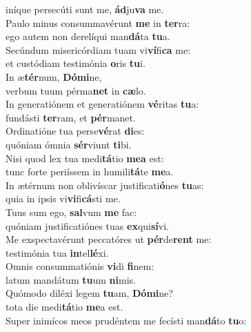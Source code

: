 \evenverse iníque persecúti sunt me, \textbf{ád}ju\textbf{va} me.\\
\oddverse Paulo minus consummavérunt \textbf{me} in \textbf{ter}ra:~\*\\
\oddverse ego autem non derelíqui man\textbf{dá}ta \textbf{tu}a.\\
\evenverse Secúndum misericórdiam tuam vi\textbf{ví}fi\textbf{ca} me:~\*\\
\evenverse et custódiam testimónia \textbf{o}ris \textbf{tu}i.\\
\oddverse In æ\textbf{tér}num, \textbf{Dó}\textbf{mi}ne,~\*\\
\oddverse verbum tuum pérma\textbf{net} in \textbf{cæ}lo.\\
\evenverse In generatiónem et generatiónem \textbf{vé}ritas \textbf{tu}a:~\*\\
\evenverse fundásti \textbf{ter}ram, et \textbf{pér}manet.\\
\oddverse Ordinatióne tua perse\textbf{vé}rat \textbf{di}es:~\*\\
\oddverse quóniam ómnia \textbf{sér}viunt \textbf{ti}bi.\\
\evenverse Nisi quod lex tua medi\textbf{tá}tio \textbf{me}\textbf{a} est:~\*\\
\evenverse tunc forte periíssem in humili\textbf{tá}te \textbf{me}a.\\
\oddverse In ætérnum non oblivíscar justificati\textbf{ó}nes \textbf{tu}as:~\*\\
\oddverse quia in ipsis vi\textbf{vi}fi\textbf{cá}sti me.\\
\evenverse Tuus sum ego, \textbf{sal}vum \textbf{me} fac:~\*\\
\evenverse quóniam justificatiónes tuas \textbf{ex}qui\textbf{sí}vi.\\
\oddverse Me exspectavérunt peccatóres ut \textbf{pér}de\textbf{rent} me:~\*\\
\oddverse testimónia tua \textbf{in}tel\textbf{lé}xi.\\
\evenverse Omnis consummatiónis \textbf{vi}di \textbf{fi}nem:~\*\\
\evenverse latum mandátum \textbf{tu}um \textbf{ni}mis.\\
\oddverse Quómodo diléxi legem \textbf{tu}am, \textbf{Dó}\textbf{mi}ne?~\*\\
\oddverse tota die medi\textbf{tá}tio \textbf{me}a est.\\
\evenverse Super inimícos meos prudéntem me fecísti man\textbf{dá}to \textbf{tu}o:~\*\\
